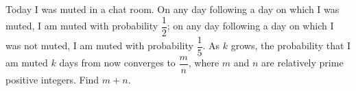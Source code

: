 Today I was muted in a chat room. On any day following a day on which I was muted, I am muted with probability $\dfrac12$; on any day following a day on which I was not muted, I am muted with probability $\dfrac15$. As $k$ grows, the probability that I am muted $k$ days from now converges to $\dfrac mn$, where $m$ and $n$ are relatively prime positive integers. Find $m+n$.
